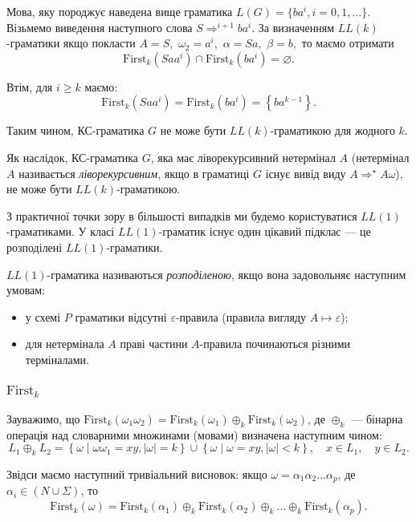 Мова, яку породжує наведена вище граматика $L(G) = \{ ba^i, i = 0, 1, \ldots \}$. Візьмемо виведення наступного слова $S \Rightarrow^{i+1} b a^i$. За визначенням $LL(k)$-граматики якщо покласти $A = S,$ $\omega_2 = a^i,$ $\alpha = S a,$ $\beta = b,$ то маємо отримати
\[\text{First}_k \left(S a a^i\right) \cap \text{First}_k \left(b a^i\right) = \varnothing.\]

Втім, для $i \ge k$ маємо:\[\text{First}_k \left(S a a^i\right) = \text{First}_k \left(b a^i\right) = \left\{b a^{k - 1}\right\}.\]

Таким чином, КС-граматика $G$ не може бути $LL(k)$-граматикою для жодного $k$. \medskip

Як наслідок, КС-граматика $G$, яка має ліворекурсивний нетермінал $A$ (нетермінал $A$ називається \textit{ліворекурсивним}, якщо в граматиці $G$ існує вивід виду $A \Rightarrow^\star A \omega$), не може бути $LL(k)$-граматикою. \medskip

З практичної точки зору в більшості випадків ми будемо користуватися $LL(1)$-граматиками. У класі $LL(1)$-граматик існує один цікавий підклас --- це розподілені $LL(1)$-граматики. \medskip

$LL(1)$-граматика називаються \textit{розподіленою}, якщо вона задовольняє наступним умовам:
\begin{itemize}
	\item у схемі $P$ граматики відсутні $\varepsilon$-правила (правила вигляду $A \mapsto \varepsilon$);
	\item для нетермінала $A$ праві частини $A$-правила починаються різними терміналами.
\end{itemize}

\subsubsection{$\text{First}_k$}

Зауважимо, що $\text{First}_k (\omega_1 \omega_2) = \text{First}_k (\omega_1) \oplus_k \text{First}_k (\omega_2)$, де $\oplus_k$ --- бінарна операція над словарними множинами (мовами) визначена наступним чином:
\begin{equation}
	L_1 \oplus_k L_2 = \left\{ \omega \mid \omega \omega_1 = x y, \vert\omega\vert = k \right\} \cup  \left\{ \omega \mid \omega = x y, \vert\omega\vert < k \right\}, \quad x \in L_1, \quad y \in L_2.
\end{equation}

Звідси маємо наступний тривіальний висновок: якщо $\omega = \alpha_1 \alpha_2 \ldots \alpha_p$, де $\alpha_i \in (N \cup \Sigma)$, то
\begin{equation}
	\text{First}_k (\omega) = \text{First}_k (\alpha_1) \oplus_k \text{First}_k (\alpha_2) \oplus_k \ldots \oplus_k \text{First}_k (\alpha_p).
\end{equation}

